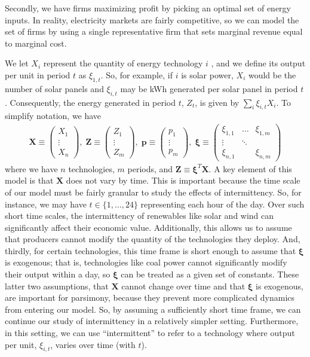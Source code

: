 \documentclass[11pt,a4paper,leqno]{extarticle}
\begin{document}
	Secondly, we have firms maximizing profit by picking an optimal set of energy inputs. In reality, electricity markets are fairly competitive, so we can model the set of firms by using a single representative firm that sets marginal revenue equal to marginal cost. 
	
	We let $X_i$  represent the quantity of energy technology $i$ , and we define its output per unit in period $t$ as $\xi_{1,t}$. So, for example, if $i$ is solar power, $X_i$ would be the number of solar panels and $\xi_{i,t}$ may be kWh generated per solar panel in period $t$. Consequently, the energy generated in period $t$, $Z_t$, is given by $\sum_i \xi_{i,t} X_i$. To simplify notation, we have
	\begin{align}
	\mathbf{X} \equiv \begin{pmatrix}
	X_1\\
	\vdots\\
	X_n
	\end{pmatrix} ,\;
	\mathbf{Z} \equiv \begin{pmatrix}
	Z_1\\
	\vdots\\
	Z_m
	\end{pmatrix} ,\;
	\mathbf{p} \equiv \begin{pmatrix}
	p_1\\
	\vdots\\
	p_m
	\end{pmatrix} ,\;
	\boldsymbol{\xi} \equiv \begin{pmatrix}
	\xi_{1,1} & \dots & \xi_{1,m}\\
	\vdots & \ddots & \\
	\xi_{n,1} &  & \xi_{n,m}
	\end{pmatrix} 
	\end{align}
	where we have $n$ technologies, $m$ periods, and $\mathbf{Z} \equiv \boldsymbol{\xi}^T \mathbf{X}$. A key element of this model is that $\mathbf{X}$ does not vary by time. This is important because the time scale of our model must be fairly granular to study the effects of intermittency. So, for instance, we may have $t \in \{ 1, \dots, 24\}$ representing each hour of the day. Over such short time scales, the intermittency of renewables like solar and wind can significantly affect their economic value. Additionally, this allows us to assume that producers cannot modify the quantity of the technologies they deploy. And, thirdly, for certain technologies, this time frame is short enough to assume that $\boldsymbol{\xi}$ is exogenous; that is, technologies like coal power cannot significantly modify their output within a day, so $\boldsymbol{\xi}$ can be treated as a given set of constants. These latter two assumptions, that $\mathbf{X}$ cannot change over time and that $\boldsymbol{\xi}$ is exogenous, are important for parsimony, because they prevent more complicated dynamics from entering our model. So, by assuming a sufficiently short time frame, we can continue our study of intermittency in a relatively simpler setting. Furthermore, in this setting, we can use ``intermittent'' to refer to a technology where output per unit, $\xi_{i,t}$, varies over time (with $t$). 	
	
\end{document}
